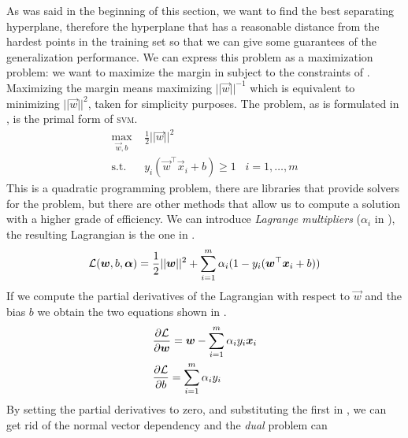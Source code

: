 As was said in the beginning of this section, we want to find the best separating hyperplane,
therefore the hyperplane that has a reasonable distance from the hardest points in the training set
so that we can give some guarantees of the generalization performance. We can express this problem as a maximization problem:
we want to maximize the margin in  subject to the constraints of
. Maximizing the margin means maximizing $||\vec{w}||^{-1}$ which is equivalent
to minimizing $||\vec{w}||^2$, taken for simplicity purposes. The problem, as is formulated in
, is the primal form of \textsc{svm}.
\begin{equation}
	\label{eq:primal}
	\begin{aligned}
		\max_{\vec{w}, b} & \frac{1}{2}||\vec{w}||^2                                                   \\
		 \text{s.t.}\hspace{10pt} & y_i(\vec{w}^\top\vec{x}_i + b) \geq 1 \hspace{10pt}i = 1, \ldots, m
	\end{aligned}
\end{equation}
This is a quadratic programming problem, there are libraries that provide solvers for the problem,
but there are other methods that allow us to compute a solution with a higher grade of efficiency.
We can introduce \emph{Lagrange multipliers} ($\alpha_i$ in ), the resulting
Lagrangian is the one in .
\begin{equation}
	\label{eq:lagrangian}
	\mathcal{L}(\boldsymbol{w}, b, \boldsymbol{\alpha}) = \frac{1}{2} ||\boldsymbol{w}||^2 + \sum_{i = 1}^{m}{\alpha_i (1 - y_i(\boldsymbol{w}^\top\boldsymbol{x}_i + b))}
\end{equation}
If we compute the partial derivatives of the Lagrangian with respect to $\vec{w}$ and the bias $b$
we obtain the two equations shown in .
\begin{equation}
	\label{eq:pd-lagrangian}
	\begin{aligned}
		 & \frac{\partial{\mathcal{L}}}{\partial{\boldsymbol{w}}} = \boldsymbol{w} - \sum_{i = 1}^m
		\alpha_iy_i\boldsymbol{x}_i                                                   \\
		 & \frac{\partial{\mathcal{L}}}{\partial{b}} = \sum_{i = 1}^m \alpha_iy_i
	\end{aligned}
\end{equation}
By setting the partial derivatives to zero, and substituting the first in
, we can get rid of the normal vector dependency and the \emph{dual} problem can
